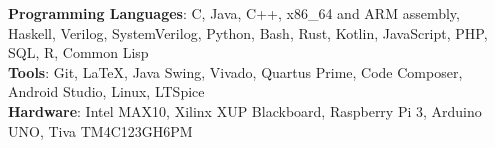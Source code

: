 \textbf{Programming Languages}: C, Java, C++, x86\_64 and ARM assembly, Haskell, Verilog, SystemVerilog, Python, Bash, Rust, Kotlin, JavaScript, PHP, SQL, R, Common Lisp \\
\textbf{Tools}: Git, \LaTeX{}, Java Swing, Vivado, Quartus Prime, Code Composer, Android Studio, Linux, LTSpice\\
\textbf{Hardware}: Intel MAX10, Xilinx XUP Blackboard, Raspberry Pi 3, Arduino UNO, Tiva TM4C123GH6PM